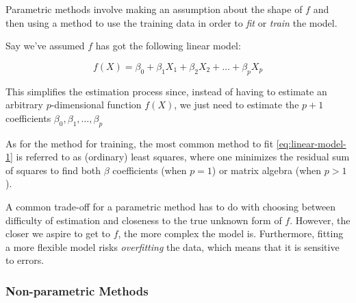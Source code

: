 \documentclass{article}
\theoremstyle{mytheoremstyle}
\theoremstyle{mytheoremstyle}
\theoremstyle{myproblemstyle}
\begin{document}
Parametric methods involve making an assumption about
the shape of $ f $ and then using a method to use
the training data in order to \textit{fit} or
\textit{train} the model.

Say we've assumed
$ f $ has got the following linear model:

\begin{equation}
  f(X) = \beta_0 + \beta_1 X_1 + \beta_2 X_2 +
  \dots + \beta_p X_p
  \label{eq:linear-model-1}
\end{equation}

This simplifies the estimation process since,
instead of having to estimate an arbitrary
$ p $-dimensional function $ f(X) $,
we just need to estimate the $ p + 1 $ coefficients
$ \beta_0, \beta_1, \dots, \beta_p $

As for the method for training, the most common
method to fit \eqref{eq:linear-model-1} is
referred to as (ordinary) least squares, where
one minimizes the residual sum of squares to
find both $ \beta $ coefficients (when $ p = 1 $) or
matrix algebra (when $ p > 1 $).

A common trade-off for a parametric method has to
do with choosing between
difficulty of estimation and closeness to
the true unknown form of $ f $.
However, the closer we aspire to get to $ f $,
the more complex the model is. Furthermore,
fitting a more flexible model risks \textit{overfitting}
the data, which means that it is sensitive to errors.


\subsubsection{Non-parametric Methods} %





\end{document}
